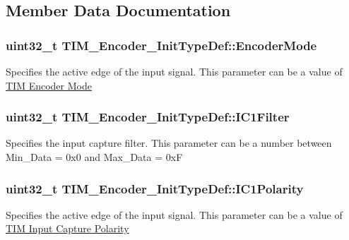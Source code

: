 \subsection{Member Data Documentation}
\subsubsection[{\texorpdfstring{Encoder\+Mode}{EncoderMode}}]{\setlength{\rightskip}{0pt plus 5cm}uint32\+\_\+t T\+I\+M\+\_\+\+Encoder\+\_\+\+Init\+Type\+Def\+::\+Encoder\+Mode}\hypertarget{struct_t_i_m___encoder___init_type_def_ab1e4b0752d88c04081e3ff2fea6aa52e}{}\label{struct_t_i_m___encoder___init_type_def_ab1e4b0752d88c04081e3ff2fea6aa52e}
Specifies the active edge of the input signal. This parameter can be a value of \hyperlink{group___t_i_m___encoder___mode}{T\+IM Encoder Mode} 
\subsubsection[{\texorpdfstring{I\+C1\+Filter}{IC1Filter}}]{\setlength{\rightskip}{0pt plus 5cm}uint32\+\_\+t T\+I\+M\+\_\+\+Encoder\+\_\+\+Init\+Type\+Def\+::\+I\+C1\+Filter}\hypertarget{struct_t_i_m___encoder___init_type_def_a50f3051c1b568b9dcde146199f97f3fb}{}\label{struct_t_i_m___encoder___init_type_def_a50f3051c1b568b9dcde146199f97f3fb}
Specifies the input capture filter. This parameter can be a number between Min\+\_\+\+Data = 0x0 and Max\+\_\+\+Data = 0xF 
\subsubsection[{\texorpdfstring{I\+C1\+Polarity}{IC1Polarity}}]{\setlength{\rightskip}{0pt plus 5cm}uint32\+\_\+t T\+I\+M\+\_\+\+Encoder\+\_\+\+Init\+Type\+Def\+::\+I\+C1\+Polarity}\hypertarget{struct_t_i_m___encoder___init_type_def_a3e27323d593e4f3b95ebaa3772e79618}{}\label{struct_t_i_m___encoder___init_type_def_a3e27323d593e4f3b95ebaa3772e79618}
Specifies the active edge of the input signal. This parameter can be a value of \hyperlink{group___t_i_m___input___capture___polarity}{T\+IM Input Capture Polarity} 
